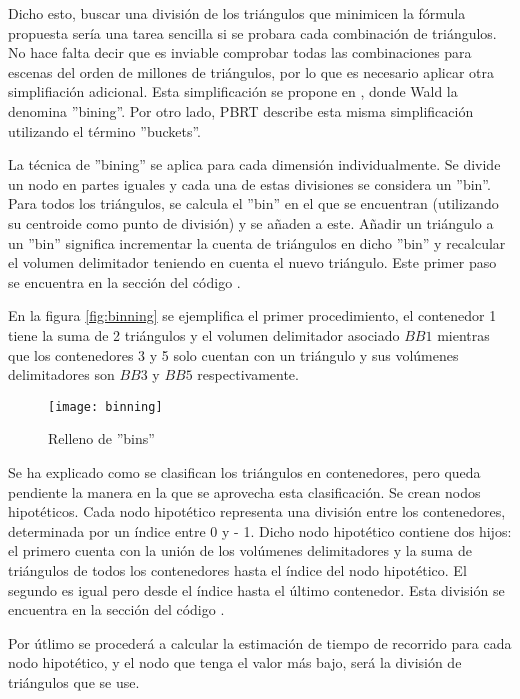 Dicho esto, buscar una división de los triángulos que minimicen la fórmula propuesta sería una tarea sencilla si se probara cada combinación de triángulos. No hace falta decir que es inviable comprobar todas las combinaciones para escenas del orden de millones de triángulos, por lo que es necesario aplicar otra simplifiación adicional. Esta simplificación se propone en \cite{wald2007fast}, donde Wald la denomina ''bining''. Por otro lado, PBRT \cite{pharr2016physically} describe esta misma simplificación utilizando el término ''buckets''.

La técnica de ''bining'' se aplica para cada dimensión individualmente. Se divide un nodo en  partes iguales y cada una de estas divisiones se considera un ''bin''. Para todos los triángulos, se calcula el ''bin'' en el que se encuentran (utilizando su centroide como punto de división) y se añaden a este. Añadir un triángulo a un ''bin'' significa incrementar la cuenta de triángulos en dicho ''bin'' y recalcular el volumen delimitador teniendo en cuenta el nuevo triángulo. Este primer paso se encuentra en la sección del código .

En la figura \autoref{fig:binning} se ejemplifica el primer procedimiento, el contenedor 1 tiene la suma de 2 triángulos y el volumen delimitador asociado $BB1$ mientras que los contenedores 3 y 5 solo cuentan con un triángulo y sus volúmenes delimitadores son $BB3$ y $BB5$ respectivamente.

\begin{figure}[H]
    \centering
	\texttt{[image: binning]}
	\caption{Relleno de ''bins''}
	\label{fig:binning}
\end{figure}

Se ha explicado como se clasifican los triángulos en contenedores, pero queda pendiente la manera en la que se aprovecha esta clasificación. Se crean  nodos hipotéticos. Cada nodo hipotético representa una división entre los contenedores, determinada por un índice entre 0 y  - 1. Dicho nodo hipotético contiene dos hijos: el primero cuenta con la unión de los volúmenes delimitadores y la suma de triángulos de todos los contenedores hasta el índice del nodo hipotético. El segundo es igual pero desde el índice hasta el último contenedor. Esta división se encuentra en la sección del código .

Por útlimo se procederá a calcular la estimación de tiempo de recorrido para cada nodo hipotético, y el nodo que tenga el valor más bajo, será la división de triángulos que se use.


